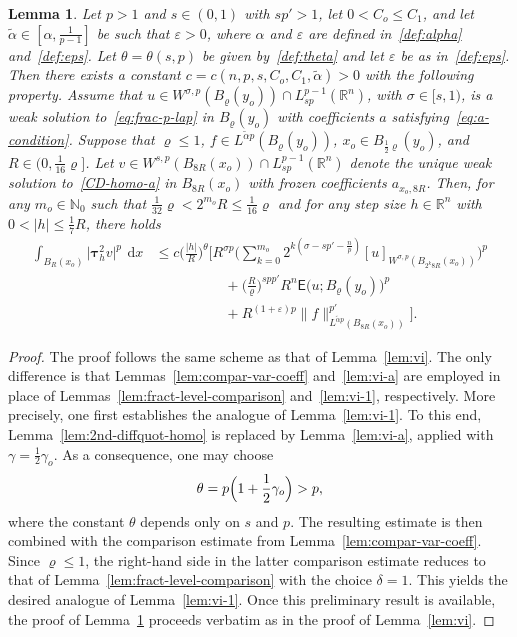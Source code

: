 \documentclass[10pt,letterpaper]{amsart}
\newtheorem{lemma}[theorem]{Lemma}
\theoremstyle{definition}
\numberwithin{theorem}{section}
\numberwithin{equation}{section}
\newcommand{\1}{\ensuremath{\mathds{1}}}
\newcommand\sfE{{\boldsymbol{\mathsf E}}}
\renewcommand{\epsilon}{\varepsilon}
\renewcommand{\rho}{\varrho}
\renewcommand{\epsilon}{\varepsilon}
\renewcommand{\rho}{\varrho}
\renewcommand{\d}{\:\! \mathrm{d}}
\numberwithin{equation}{section}
\begin{document}
\begin{lemma}\label{lem:wi}
Let $p>1$ and $s\in(0,1)$ with $sp'>1$, let $0<C_o\le C_1$, and let $\tilde\alpha\in[\alpha,\frac{1}{p-1}]$ be such that $\epsilon>0$, where $\alpha$ and $\epsilon$ are defined in~\eqref{def:alpha} and~\eqref{def:eps}.
Let $\theta=\theta(s,p)$ be given by~\eqref{def:theta}
and let $\varepsilon$ be as in~\eqref{def:eps}.
Then there exists a constant
$c=c(n,p,s,C_o,C_1,\tilde\alpha)>0$ with the following property.
Assume that
$u\in W^{\sigma,p}(B_\rho(y_o))\cap L^{p-1}_{sp}(\mathbb{R}^n)$,
with $\sigma\in[s,1)$, is a weak solution to~\eqref{eq:frac-p-lap}
in $B_\rho(y_o)$ with coefficients $a$ satisfying~\eqref{eq:a-condition}.
Suppose that $\rho\le1$, $f\in L^{\tilde\alpha p}(B_\rho(y_o))$,
$x_o\in B_{\frac12 \rho}(y_o)$, and $R\in(0,\frac1{16}\rho]$.
Let
$v\in W^{s,p}(B_{8R}(x_o))\cap L^{p-1}_{sp}(\mathbb{R}^n)$
denote the unique weak solution to~\eqref{CD-homo-a}
in $B_{8R}(x_o)$ with frozen coefficients $a_{x_o,8R}$.
Then, for any $m_o\in\mathbb{N}_0$ such that
$
\frac{1}{32}\rho < 2^{m_o}R \le \frac{1}{16}\rho
$
and for any step size $h\in\mathbb{R}^n$ with $0<|h|\le \frac17R$, there holds
\begin{align*}
    \int_{B_R(x_o)} \big|\boldsymbol{\tau}_h^2 v\big|^p \, \d x
    &\le
    c \Big(\frac{|h|}{R}\Big)^{\theta}
    \Bigg[
        R^{\sigma p}
        \Bigg(
            \sum_{k=0}^{m_o}
            2^{k(\sigma-sp' - \frac{n}{p})}
            [u]_{W^{\sigma,p}(B_{2^k 8R}(x_o))}
        \Bigg)^p \\
    &\qquad\qquad\quad
        + \Big(\frac{R}{\rho}\Big)^{spp'} R^n
        \sfE \big(u;B_\rho(y_o)\big)^p \\
    &\qquad\qquad\quad
        + R^{(1+\varepsilon)p}
        \|f\|_{L^{\tilde\alpha p}(B_{8R}(x_o))}^{p'}
    \Bigg].
\end{align*}
\end{lemma}



\begin{proof}
The proof follows the same scheme as that of Lemma~\ref{lem:vi}.
The only difference is that Lemmas~\ref{lem:compar-var-coeff}
and~\ref{lem:vi-a} are employed in place of
Lemmas~\ref{lem:fract-level-comparison} and~\ref{lem:vi-1},
respectively. More precisely, one first establishes the analogue of Lemma~\ref{lem:vi-1}.
To this end, Lemma~\ref{lem:2nd-diffquot-homo} is replaced by
Lemma~\ref{lem:vi-a}, applied with $\gamma=\frac12\gamma_o$.
As a consequence, one may choose
\[
\theta = p\Bigl(1+\frac12\gamma_o\Bigr) > p,
\]
where the constant $\theta$ depends only on $s$ and $p$.
The resulting estimate is then combined with the comparison estimate
from Lemma~\ref{lem:compar-var-coeff}.
Since $\rho\le1$, the right-hand side in the latter comparison estimate
reduces to that of Lemma~\ref{lem:fract-level-comparison} with the choice
$\delta=1$.
This yields the desired analogue of Lemma~\ref{lem:vi-1}.
Once this preliminary result is available, the proof of
Lemma~\ref{lem:wi} proceeds verbatim as in the proof of
Lemma~\ref{lem:vi}. 
\end{proof}
\end{document}
